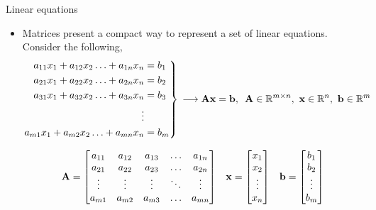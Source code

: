 \documentclass[aspectratio=169]{beamer}
\def\mf{\ensuremath\mathbf}
\begin{document}
\begin{frame}[t]{Linear equations}
\begin{itemize}
\item Matrices present a compact way to represent a set of linear equations. Consider the following,
\[
\begin{rcases*}
\begin{split}
a_{11}x_1 + a_{12}x_2 \ldots + a_{1n}x_n & = b_1 \\
a_{21}x_1 + a_{22}x_2 \ldots + a_{2n}x_n & = b_2 \\
a_{31}x_1 + a_{32}x_2 \ldots + a_{3n}x_n & = b_3 \\
\vdots \\
a_{m1}x_1 + a_{m2}x_2 \ldots + a_{mn}x_n & = b_m \\
\end{split}
\end{rcases*} \, \longrightarrow \mf{Ax} = \mf{b}, \,\,\, \mf{A} \in \mathbb{R}^{m \times n}, \,\, \mf{x} \in \mathbb{R}^n, \,\, \mf{b} \in \mathbb{R}^m
\]

\[
\mf{A} = \begin{bmatrix}
a_{11} & a_{12} & a_{13} & \ldots & a_{1n}\\
a_{21} & a_{22} & a_{23} & \ldots & a_{2n}\\
\vdots & \vdots & \vdots & \ddots & \vdots\\
a_{m1} & a_{m2} & a_{m3} & \ldots & a_{mn}\\
\end{bmatrix} \,\,\,\,\, 
\mf{x} = \begin{bmatrix}
x_1\\ x_2\\ \vdots \\ x_n
\end{bmatrix} \,\,\,\,\,
\mf{b} = \begin{bmatrix}
b_1\\ b_2\\ \vdots \\ b_m
\end{bmatrix}
\]
\end{itemize}
\end{frame}
\end{document}
